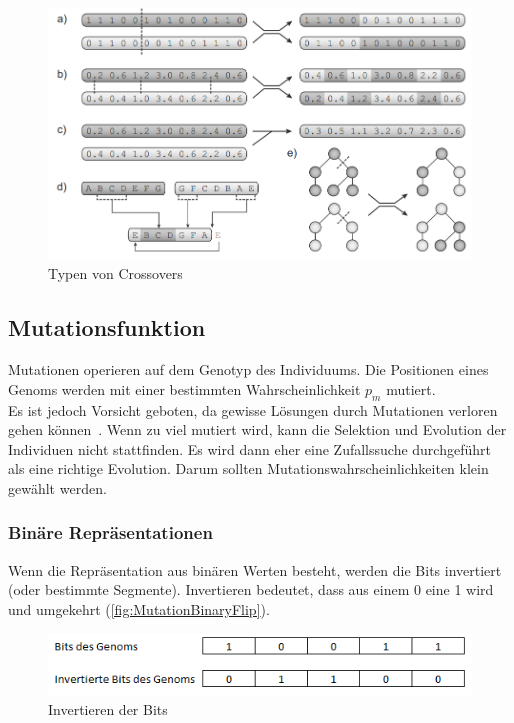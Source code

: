         \begin{figure}[H]
          \includegraphics[width=\textwidth,center]{graphics/crossover_types}
          \caption[\protect{}, S.27]{Typen von Crossovers\label{fig:crossTypes}}
        \end{figure}

    \subsection{Mutationsfunktion~\label{sub:mutFunction}}

      Mutationen operieren auf dem Genotyp des Individuums.
      Die Positionen eines Genoms werden mit einer bestimmten Wahrscheinlichkeit \(p_{m}\) mutiert.
      \\
      Es ist jedoch Vorsicht geboten, da gewisse Lösungen durch Mutationen verloren gehen können~\cite{Sampson1976}.
      Wenn zu viel mutiert wird, kann die Selektion und Evolution der Individuen nicht stattfinden.
      Es wird dann eher eine Zufallssuche durchgeführt als eine richtige Evolution.
      Darum sollten Mutationswahrscheinlichkeiten klein gewählt werden.

      \subsubsection{Binäre Repräsentationen}

        Wenn die Repräsentation aus binären Werten besteht, werden die Bits invertiert (oder bestimmte Segmente).
        Invertieren bedeutet, dass aus einem 0 eine 1 wird und umgekehrt (\vref{fig:MutationBinaryFlip}).

        \begin{figure}[H]
          \includegraphics[scale=1,center]{graphics/mutation_binary_flip}
          \caption{Invertieren der Bits\label{fig:MutationBinaryFlip}}
        \end{figure}

